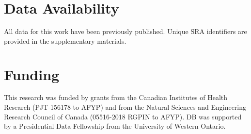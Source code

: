 \documentclass[12pt]{article}
\begin{document}
\section*{Data Availability}

All data for this work have been previously published. Unique SRA identifiers are provided in the supplementary materials.

\section*{Funding}

This research was funded by grants from the Canadian Institutes of Health Research (PJT-156178 to AFYP) and from the Natural Sciences and Engineering Research Council of Canada (05516-2018 RGPIN to AFYP). %
DB was supported by a Presidential Data Fellowship from the University of Western Ontario.

\printbibliography
\end{document}
